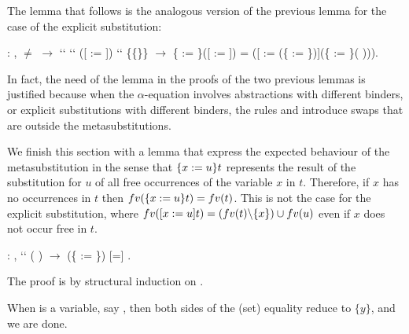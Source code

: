 The lemma  that follows is the analogous version of the previous lemma for the case of the explicit substitution:
\begin{coqdoccode}
\coqdocemptyline
\coqdocnoindent
{}  : \coqdockw{\ensuremath{\forall}}      ,  \ensuremath{\not=}  \ensuremath{\rightarrow}  ``   ``  ([ := ]) `` \{\{\}\} \ensuremath{\rightarrow} \{ := \}([ := ]) = ([ := (\{ := \})](\{ := \}(   ))).\coqdoceol
\coqdocemptyline
\end{coqdoccode}
In fact, the need of the lemma  in the proofs of the two previous lemmas is justified because when the $\alpha$-equation involves abstractions with different binders, or explicit substitutions with different binders, the rules  and  introduce swaps that are outside the metasubstitutions. 
\begin{coqdoccode}
\coqdocemptyline
\coqdocemptyline
\end{coqdoccode}
We finish this section with a lemma that express the expected behaviour of the metasubstitution in the sense that $\metasub{t}{x}{u}$ represents the result of the substitution for $u$ of all free occurrences of the variable $x$ in $t$. Therefore, if $x$ has no occurrences in $t$ then $fv(\metasub{t}{x}{u}) = fv(t)$. This is not the case for the explicit substitution, where $fv(\esub{t}{x}{u}) = (fv(t)\backslash \{x\})\cup fv(u)$ even if $x$ does not occur free in $t$.
\begin{coqdoccode}
\coqdocemptyline
\coqdocnoindent
{} : \coqdockw{\ensuremath{\forall}}   ,  `` ( ) \ensuremath{\rightarrow}   (\{ := \}) [=]  .\coqdoceol
 \end{coqdoccode}
 The proof is by structural induction on .
\begin{coqdoccode}
\end{coqdoccode}
When  is a variable, say , then both sides of the (set) equality reduce to $\{y\}$, and we are done.
\begin{coqdoccode}
\coqdocemptyline
\end{coqdoccode}
